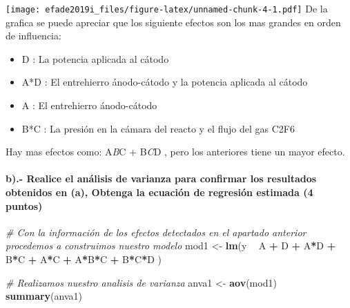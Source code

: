 \documentclass[]{article}
\newenvironment{Shaded}{\begin{snugshade}}{\end{snugshade}}
\newcommand{\CommentTok}[1]{\textcolor[rgb]{0.56,0.35,0.01}{\textit{#1}}}
\newcommand{\KeywordTok}[1]{\textcolor[rgb]{0.13,0.29,0.53}{\textbf{#1}}}
\newcommand{\NormalTok}[1]{#1}
\newcommand{\OperatorTok}[1]{\textcolor[rgb]{0.81,0.36,0.00}{\textbf{#1}}}
\newcommand{\StringTok}[1]{\textcolor[rgb]{0.31,0.60,0.02}{#1}}
\providecommand{\tightlist}{%
  \setlength{\itemsep}{0pt}\setlength{\parskip}{0pt}}
\let\oldparagraph\paragraph
\renewcommand{\paragraph}[1]{\oldparagraph{#1}\mbox{}}
\begin{document}
\texttt{[image: efade2019i\_files/figure-latex/unnamed-chunk-4-1.pdf]} De
la grafica se puede apreciar que los siguiente efectos son los mas
grandes en orden de influencia:

\begin{itemize}
\tightlist
\item
  D : La potencia aplicada al cátodo
\item
  A*D : El entrehierro ánodo-cátodo y la potencia aplicada al cátodo
\item
  A : El entrehierro ánodo-cátodo
\item
  B*C : La presión en la cámara del reacto y el flujo del gas C2F6
\end{itemize}

Hay mas efectos como: A\emph{B}C + B\emph{C}D , pero los anteriores
tiene un mayor efecto.

\hypertarget{b.--realice-el-analisis-de-varianza-para-confirmar-los-resultados-obtenidos-en-a-obtenga-la-ecuacion-de-regresion-estimada-4-puntos}{%
\paragraph{b).- Realice el análisis de varianza para confirmar los
resultados obtenidos en (a), Obtenga la ecuación de regresión estimada
(4
puntos)}\label{b.--realice-el-analisis-de-varianza-para-confirmar-los-resultados-obtenidos-en-a-obtenga-la-ecuacion-de-regresion-estimada-4-puntos}}

\begin{Shaded}
\begin{Highlighting}[]
\CommentTok{# Con la información de los efectos detectados en el apartado anterior procedemos a  construimos nuestro modelo}
\NormalTok{mod1  <-}\StringTok{ }\KeywordTok{lm}\NormalTok{(y }\OperatorTok{~}\StringTok{ }\NormalTok{A }\OperatorTok{+}\StringTok{ }\NormalTok{D }\OperatorTok{+}\StringTok{ }\NormalTok{A}\OperatorTok{*}\NormalTok{D }\OperatorTok{+}\StringTok{ }\NormalTok{B}\OperatorTok{*}\NormalTok{C }\OperatorTok{+}\StringTok{ }\NormalTok{A}\OperatorTok{*}\NormalTok{C }\OperatorTok{+}\StringTok{ }\NormalTok{A}\OperatorTok{*}\NormalTok{B}\OperatorTok{*}\NormalTok{C }\OperatorTok{+}\StringTok{ }\NormalTok{B}\OperatorTok{*}\NormalTok{C}\OperatorTok{*}\NormalTok{D )}
\end{Highlighting}
\end{Shaded}

\begin{Shaded}
\begin{Highlighting}[]
\CommentTok{# Realizamos nuestro analisis de varianza}
\NormalTok{anva1 <-}\StringTok{ }\KeywordTok{aov}\NormalTok{(mod1)}
\KeywordTok{summary}\NormalTok{(anva1)}
\end{Highlighting}
\end{Shaded}
\end{document}
